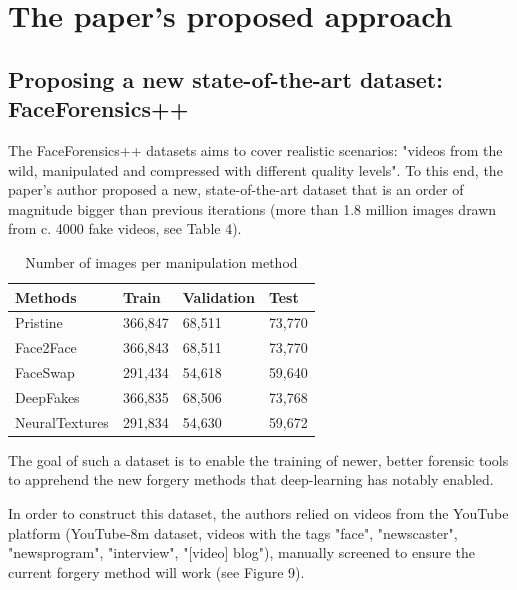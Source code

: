 \documentclass{article} %
\begin{document}
\section{The paper's proposed approach}

\subsection{Proposing a new state-of-the-art dataset: FaceForensics++}

The FaceForensics++ datasets aims to cover realistic scenarios: "videos from the wild, manipulated and compressed with different quality levels". To this end, the paper's author proposed a new, state-of-the-art dataset that is an order of magnitude bigger than previous iterations (more than 1.8 million images drawn from c. 4000 fake videos, see Table 4).

\begin{table}[h!]
\centering
\begin{tabular}{ |p{4cm}|p{2.5cm}|p{2.5cm}| p{2.5cm}| }
 \hline
 \textbf{Methods} & \textbf{Train} & \textbf{Validation} & \textbf{Test} \\
 \hline
 Pristine & 366,847 & 68,511 & 73,770 \\
 Face2Face & 366,843 & 68,511 & 73,770 \\
 FaceSwap & 291,434 & 54,618 & 59,640 \\
 DeepFakes & 366,835 & 68,506 & 73,768 \\
 NeuralTextures & 291,834 & 54,630 & 59,672 \\
 \hline
\end{tabular}
\caption{Number of images per manipulation method}
\end{table}

The goal of such a dataset is to enable the training of newer, better forensic tools to apprehend the new forgery methods that deep-learning has notably enabled. 

In order to construct this dataset, the authors relied on videos from the YouTube platform (YouTube-8m dataset, videos with the tags "face", "newscaster", "newsprogram", "interview", "[video] blog"), manually screened to ensure the current forgery method will work (see Figure 9). 
\end{document}
